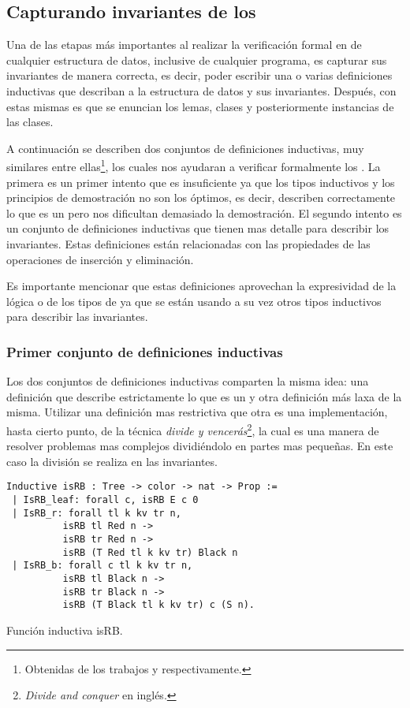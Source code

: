 \subsection{Capturando invariantes de los {\arns}}
Una de las etapas m\'as importantes al realizar la verificaci\'on formal en {\coq} de cualquier estructura de
datos, inclusive de cualquier programa, es capturar sus invariantes de manera correcta, es decir,
poder escribir una o varias definiciones inductivas que describan a la estructura de datos y sus
invariantes. Después, con estas mismas es que se enuncian los lemas, clases y posteriormente
instancias de las clases.

A continuaci\'on se describen dos conjuntos de definiciones inductivas, muy similares entre 
ellas\footnote{Obtenidas de los trabajos \cite{tesisG} y \cite{MSetRBT} respectivamente.},
los cuales nos ayudaran a verificar formalmente los {\arns}. La primera es un primer intento que es
insuficiente ya que los tipos inductivos y los principios de demostraci\'on no son los \'optimos, es decir, 
describen correctamente lo que es un {\arn} pero nos dificultan demasiado la demostraci\'on.
El segundo intento es un conjunto de definiciones inductivas que tienen mas detalle para describir
los invariantes. Estas definiciones est\'an relacionadas con las propiedades de las operaciones de
inserci\'on y eliminaci\'on.

Es importante mencionar que estas definiciones aprovechan la expresividad de la lógica o de 
los tipos de {\coq} ya que se est\'an usando a su vez otros tipos inductivos para describir las invariantes.

\subsubsection{Primer conjunto de definiciones inductivas}
Los dos conjuntos de definiciones inductivas comparten la misma idea: una definici\'on que describe
estrictamente lo que es un {\arn} y otra definici\'on m\'as laxa de la misma. Utilizar una definici\'on
mas restrictiva que otra es una implementaci\'on, hasta cierto punto, de la t\'ecnica 
\textit{divide y vencerás}\footnote{\textit{Divide and conquer} en ingl\'es.}, la cual es una manera 
de resolver problemas mas complejos dividiéndolo en partes mas pequeñas. En este caso la división se realiza en las invariantes.

\begin{listing}[!ht]
\centering
\captionsetup{justification=centering}
\begin{verbatim}
Inductive isRB : Tree -> color -> nat -> Prop :=
 | IsRB_leaf: forall c, isRB E c 0
 | IsRB_r: forall tl k kv tr n,
          isRB tl Red n ->
          isRB tr Red n ->
          isRB (T Red tl k kv tr) Black n
 | IsRB_b: forall c tl k kv tr n,
          isRB tl Black n ->
          isRB tr Black n ->
          isRB (T Black tl k kv tr) c (S n).
\end{verbatim}
\caption{Funci\'on inductiva isRB.}
\label{inductive_isRB}
\end{listing}

